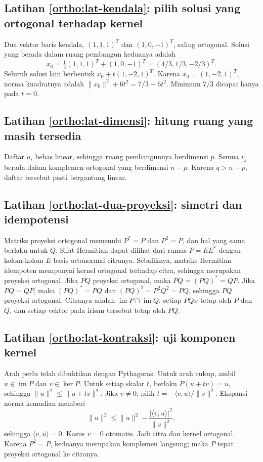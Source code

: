 \subsection*{Latihan \ref{ortho:lat-kendala}: pilih solusi yang ortogonal terhadap kernel}
Dua vektor baris kendala, $(1,1,1)^T$ dan $(1,0,-1)^T$,
saling ortogonal. Solusi yang berada dalam ruang pembangun
keduanya adalah
\[
    x_0=\tfrac13(1,1,1)^T+(1,0,-1)^T
       =(4/3,1/3,-2/3)^T.
\]
Seluruh solusi lain berbentuk $x_0+t(1,-2,1)^T$.
Karena $x_0\perp(1,-2,1)^T$, norma kuadratnya adalah
$\|x_0\|^2+6t^2=7/3+6t^2$.
Minimum $7/3$ dicapai hanya pada $t=0$.

\subsection*{Latihan \ref{ortho:lat-dimensi}: hitung ruang yang masih tersedia}
Daftar $u_i$ bebas linear, sehingga ruang pembangunnya berdimensi $p$.
Semua $v_j$ berada dalam komplemen ortogonal yang berdimensi $n-p$.
Karena $q>n-p$, daftar tersebut pasti bergantung linear.

\subsection*{Latihan \ref{ortho:lat-dua-proyeksi}: simetri dan idempotensi}
Matriks proyeksi ortogonal memenuhi $P^*=P$ dan $P^2=P$,
dan hal yang sama berlaku untuk $Q$.
Sifat Hermitian dapat dilihat dari rumus
$P=EE^*$ dengan kolom-kolom $E$ basis ortonormal citranya.
Sebaliknya, matriks Hermitian idempoten mempunyai kernel
ortogonal terhadap citra, sehingga merupakan proyeksi ortogonal.
Jika $PQ$ proyeksi ortogonal, maka
$PQ=(PQ)^*=QP$.
Jika $PQ=QP$, maka $(PQ)^*=PQ$ dan $(PQ)^2=P^2Q^2=PQ$,
sehingga $PQ$ proyeksi ortogonal.
Citranya adalah $\operatorname{im}P\cap\operatorname{im}Q$:
setiap $PQx$ tetap oleh $P$ dan $Q$, dan setiap vektor pada
irisan tersebut tetap oleh $PQ$.

\subsection*{Latihan \ref{ortho:lat-kontraksi}: uji komponen kernel}
Arah perlu telah dibuktikan dengan Pythagoras.
Untuk arah cukup, ambil $u\in\operatorname{im}P$ dan $v\in\ker P$.
Untuk setiap skalar $t$, berlaku $P(u+tv)=u$, sehingga
$\|u\|^2\le\|u+tv\|^2$.
Jika $v\ne0$, pilih $t=-\langle v,u\rangle/\|v\|^2$.
Ekspansi norma kemudian memberi
\[
    \|u\|^2\le\|u\|^2-\frac{|\langle v,u\rangle|^2}{\|v\|^2},
\]
sehingga $\langle v,u\rangle=0$.
Kasus $v=0$ otomatis. Jadi citra dan kernel ortogonal.
Karena $P^2=P$, keduanya merupakan komplemen langsung;
maka $P$ tepat proyeksi ortogonal ke citranya.
\fi
